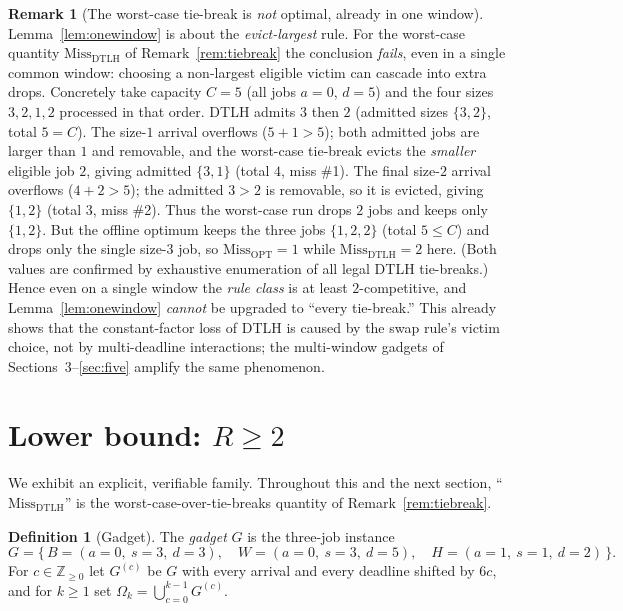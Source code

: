 \documentclass{amsart}
\theoremstyle{definition}
\newtheorem{definition}[theorem]{Definition}
\newtheorem{remark}[theorem]{Remark}
\begin{document}
\begin{remark}[The worst-case tie-break is \emph{not} optimal, already in one
window]\label{rem:onewindowbad}
Lemma~\ref{lem:onewindow} is about the \emph{evict-largest} rule. For the
worst-case quantity $\mathrm{Miss}_{\mathrm{DTLH}}$ of
Remark~\ref{rem:tiebreak} the conclusion \emph{fails}, even in a single common
window: choosing a non-largest eligible victim can cascade into extra drops.
Concretely take capacity $C=5$ (all jobs $a=0$, $d=5$) and the four sizes
$3,2,1,2$ processed in that order. DTLH admits $3$ then $2$ (admitted sizes
$\{3,2\}$, total $5=C$). The size-$1$ arrival overflows ($5+1>5$); both admitted
jobs are larger than $1$ and removable, and the worst-case tie-break evicts the
\emph{smaller} eligible job $2$, giving admitted $\{3,1\}$ (total $4$, miss \#1).
The final size-$2$ arrival overflows ($4+2>5$); the admitted $3>2$ is removable,
so it is evicted, giving $\{1,2\}$ (total $3$, miss \#2). Thus the worst-case run
drops $2$ jobs and keeps only $\{1,2\}$. But the offline optimum keeps the three
jobs $\{1,2,2\}$ (total $5\le C$) and drops only the single size-$3$ job, so
$\mathrm{Miss}_{\mathrm{OPT}}=1$ while
$\mathrm{Miss}_{\mathrm{DTLH}}=2$ here. (Both values are confirmed by exhaustive
enumeration of all legal DTLH tie-breaks.) Hence even on a single window the
\emph{rule class} is at least $2$-competitive, and Lemma~\ref{lem:onewindow}
\emph{cannot} be upgraded to ``every tie-break.'' This already shows that the
constant-factor loss of DTLH is caused by the swap rule's victim choice, not by
multi-deadline interactions; the multi-window gadgets of
Sections~3--\ref{sec:five} amplify the same phenomenon.
\end{remark}

\section{Lower bound: $R\ge 2$}

We exhibit an explicit, verifiable family. Throughout this and the next section,
``$\mathrm{Miss}_{\mathrm{DTLH}}$'' is the worst-case-over-tie-breaks quantity of
Remark~\ref{rem:tiebreak}.

\begin{definition}[Gadget]\label{def:gadget}
The \emph{gadget} $G$ is the three-job instance
\[
G=\{\,B=(a{=}0,\ s{=}3,\ d{=}3),\quad
      W=(a{=}0,\ s{=}3,\ d{=}5),\quad
      H=(a{=}1,\ s{=}1,\ d{=}2)\,\}.
\]
For $c\in\mathbb{Z}_{\ge 0}$ let $G^{(c)}$ be $G$ with every arrival and every
deadline shifted by $6c$, and for $k\ge 1$ set
$\Omega_k=\bigcup_{c=0}^{k-1}G^{(c)}$.
\end{definition}
\end{document}
